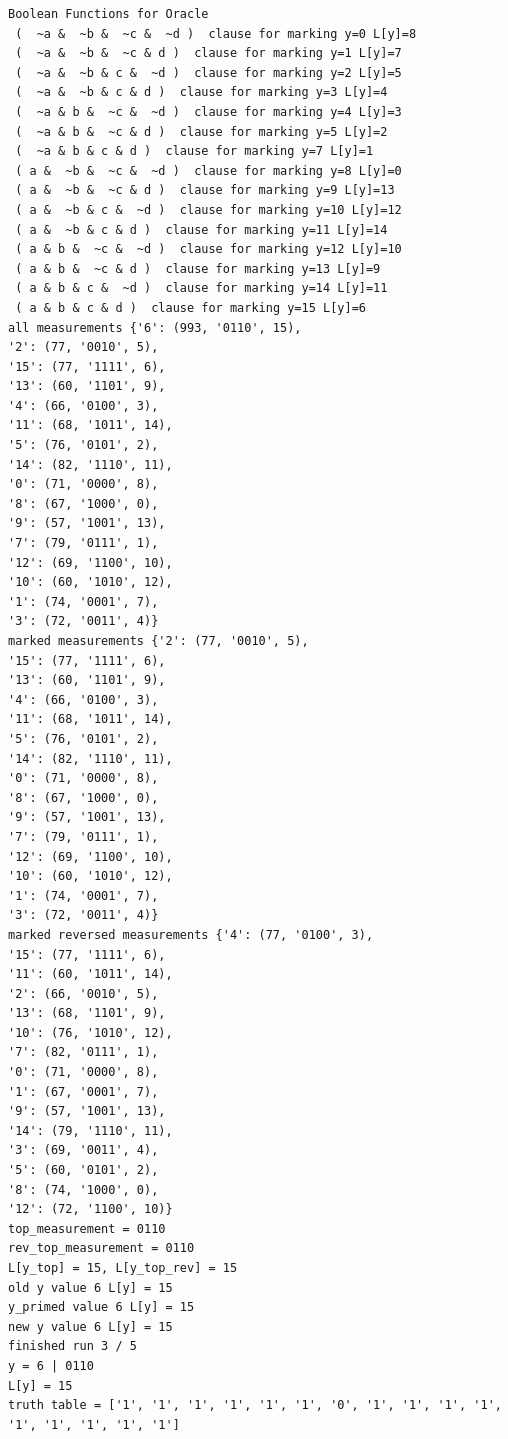 \documentclass[11pt]{article}
\begin{document}
\begin{verbatim}
Boolean Functions for Oracle
 (  ~a &  ~b &  ~c &  ~d )  clause for marking y=0 L[y]=8
 (  ~a &  ~b &  ~c & d )  clause for marking y=1 L[y]=7
 (  ~a &  ~b & c &  ~d )  clause for marking y=2 L[y]=5
 (  ~a &  ~b & c & d )  clause for marking y=3 L[y]=4
 (  ~a & b &  ~c &  ~d )  clause for marking y=4 L[y]=3
 (  ~a & b &  ~c & d )  clause for marking y=5 L[y]=2
 (  ~a & b & c & d )  clause for marking y=7 L[y]=1
 ( a &  ~b &  ~c &  ~d )  clause for marking y=8 L[y]=0
 ( a &  ~b &  ~c & d )  clause for marking y=9 L[y]=13
 ( a &  ~b & c &  ~d )  clause for marking y=10 L[y]=12
 ( a &  ~b & c & d )  clause for marking y=11 L[y]=14
 ( a & b &  ~c &  ~d )  clause for marking y=12 L[y]=10
 ( a & b &  ~c & d )  clause for marking y=13 L[y]=9
 ( a & b & c &  ~d )  clause for marking y=14 L[y]=11
 ( a & b & c & d )  clause for marking y=15 L[y]=6
all measurements {'6': (993, '0110', 15), 
'2': (77, '0010', 5), 
'15': (77, '1111', 6), 
'13': (60, '1101', 9), 
'4': (66, '0100', 3), 
'11': (68, '1011', 14), 
'5': (76, '0101', 2), 
'14': (82, '1110', 11), 
'0': (71, '0000', 8), 
'8': (67, '1000', 0), 
'9': (57, '1001', 13), 
'7': (79, '0111', 1), 
'12': (69, '1100', 10), 
'10': (60, '1010', 12), 
'1': (74, '0001', 7), 
'3': (72, '0011', 4)}
marked measurements {'2': (77, '0010', 5), 
'15': (77, '1111', 6), 
'13': (60, '1101', 9), 
'4': (66, '0100', 3), 
'11': (68, '1011', 14), 
'5': (76, '0101', 2), 
'14': (82, '1110', 11), 
'0': (71, '0000', 8), 
'8': (67, '1000', 0), 
'9': (57, '1001', 13), 
'7': (79, '0111', 1), 
'12': (69, '1100', 10), 
'10': (60, '1010', 12), 
'1': (74, '0001', 7), 
'3': (72, '0011', 4)}
marked reversed measurements {'4': (77, '0100', 3), 
'15': (77, '1111', 6), 
'11': (60, '1011', 14), 
'2': (66, '0010', 5), 
'13': (68, '1101', 9), 
'10': (76, '1010', 12), 
'7': (82, '0111', 1), 
'0': (71, '0000', 8), 
'1': (67, '0001', 7), 
'9': (57, '1001', 13), 
'14': (79, '1110', 11), 
'3': (69, '0011', 4), 
'5': (60, '0101', 2), 
'8': (74, '1000', 0), 
'12': (72, '1100', 10)}
top_measurement = 0110
rev_top_measurement = 0110
L[y_top] = 15, L[y_top_rev] = 15
old y value 6 L[y] = 15
y_primed value 6 L[y] = 15
new y value 6 L[y] = 15
finished run 3 / 5
y = 6 | 0110
L[y] = 15
truth table = ['1', '1', '1', '1', '1', '1', '0', '1', '1', '1', '1', '1', '1', '1', '1', '1']


\end{verbatim}
\end{document}
